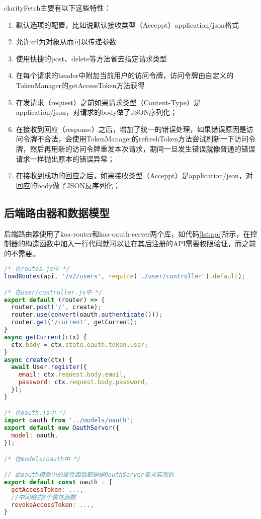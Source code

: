 clarityFetch主要有以下这些特性：
\begin{enumerate}
  \item 默认选项的配置，比如说默认接收类型（Acceppt）application/json格式
  \item 允许url为对象从而可以传递参数
  \item 使用快捷的post、delete等方法省去指定请求类型
  \item 在每个请求的header中附加当前用户的访问令牌，访问令牌由自定义的TokenManager的getAccessToken方法获得
  \item 在发请求（request）之前如果请求类型（Content-Type）是application/json，对请求的body做了JSON序列化；
  \item 在接收到回应（response）之后，增加了统一的错误处理，如果错误原因是访问令牌不合法，会使用TokenManager的refreshToken方法尝试刷新一下访问令牌，然后再用新的访问令牌重发本次请求，期间一旦发生错误就像普通的错误请求一样抛出原本的错误异常；
  \item 在接收到成功的回应之后，如果接收类型（Acceppt）是application/json，对回应的body做了JSON反序列化；
\end{enumerate}

\subsection{后端路由器和数据模型}
后端路由器使用了koa-router和koa-oauth-server两个库，如代码\ref{lst:api}所示，在控制器的构造函数中加入一行代码就可以让在其后注册的API需要权限验证，而之前的不需要。
\begin{lstlisting}[language={JavaScript}, label={lst:api}, caption={Smart City和Smart Home模块后端权限控制相关代码}]
/* 在routes.js中 */
loadRoutes(api, '/v2/users', require('./user/controller').default);

/* 在user/controller.js中 */
export default (router) => {
  router.post('/', create);
  router.use(convert(oauth.authenticate()));
  router.get('/current', getCurrent);
}
async getCurrent(ctx) {
  ctx.body = ctx.state.oauth.token.user;
}
async create(ctx) {
  await User.register({
    email: ctx.request.body.email,
    password: ctx.request.body.password,
  });
}

/* 在oauth.js中 */
import oauth from '../models/oauth';
export default new OauthServer({
  model: oauth,
});

/* 在models/oauth中 */

// 此oauth模型中的属性函数都是是OauthServer要求实现的
export default const oauth = {
  getAccessToken: ...,
  //中间略去8个属性函数
  revokeAccessToken: ...,
}
\end{lstlisting}

